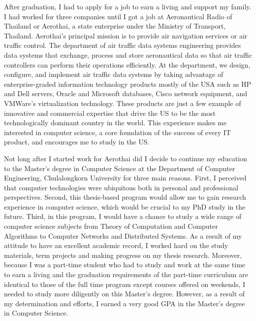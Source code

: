 \documentclass[a4paper]{report}
\begin{document}
\vspace{0.2cm}
After graduation, I had to apply for a job to earn a living and support my family. I had worked for three companies until I got a job at Aeronautical Radio of Thailand or Aerothai, a state enterprise under the Ministry of Transport, Thailand. Aerothai's principal mission is to provide air navigation services or air traffic control. The department of air traffic data systems engineering provides data systems that exchange, process and store aeronautical data so that air traffic controllers can perform their operations efficiently. At the department, we design, configure, and implement air traffic data systems by taking advantage of enterprise-graded information technology products mostly of the USA such as HP and Dell servers, Oracle and Microsoft databases, Cisco network equipment, and VMWare's virtualization technology. These products are just a few example of innovative and commercial expertise that drive the US to be the most technologically dominant country in the world. This experience makes me interested in computer science, a core foundation of the success of every IT product, and encourages me to study in the US.

\vspace{0.2cm}
Not long after I started work for Aerothai did I decide to continue my education to the Master's degree in Computer Science at the Department of Computer Engineering, Chulalongkorn University for three main reasons. First, I perceived that computer technologies were ubiquitous both in personal and professional perspectives. Second, this thesis-based program would allow me to gain research experience in computer science, which would be crucial to my PhD study in the future. Third, in this program, I would have a chance to study a wide range of computer science subjects from Theory of Computation and Computer Algorithms to Computer Networks and Distributed Systems. As a result of my attitude to have an excellent academic record, I worked hard on the study materials, term projects and making progress on my thesis research. Moreover, because I was a part-time student who had to study and work at the same time to earn a living and the graduation requirements of the part-time curriculum are identical to those of the full time program except courses offered on weekends, I needed to study more diligently on this Master's degree. However, as a result of my determination and efforts, I earned a very good GPA in the Master's degree in Computer Science.
\end{document}

